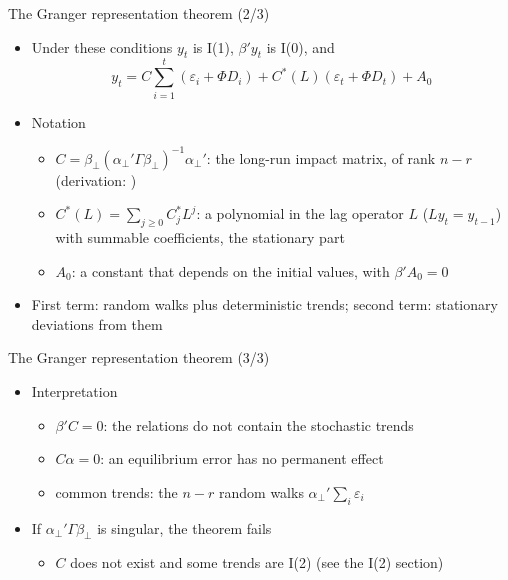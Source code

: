 \begin{frame}{The Granger representation theorem (2/3)}
\itemsize{\small}
\begin{itemize}
    \item Under these conditions $y_t$ is I(1), $\beta'y_t$ is I(0), and \[ y_t = C\sum_{i=1}^{t}(\varepsilon_i + \Phi D_i) + C^*(L)(\varepsilon_t + \Phi D_t) + A_0 \]
    \item Notation
    \begin{itemize}
        \item $C = \beta_\perp(\alpha_\perp'\Gamma\beta_\perp)^{-1}\alpha_\perp'$: the long-run impact matrix, of rank $n - r$ (derivation: )  %
        \item $C^*(L) = \sum_{j\ge 0}C_j^*L^j$: a polynomial in the lag operator $L$ ($Ly_t = y_{t-1}$) with summable coefficients, the stationary part
        \item $A_0$: a constant that depends on the initial values, with $\beta'A_0 = 0$
    \end{itemize}
    \item First term: random walks plus deterministic trends; second term: stationary deviations from them
\end{itemize}
\end{frame}

\begin{frame}{The Granger representation theorem (3/3)}
\itemsize{\small}
\begin{itemize}
    \item Interpretation
    \begin{itemize}
        \item $\beta'C = 0$: the relations do not contain the stochastic trends
        \item $C\alpha = 0$: an equilibrium error has no permanent effect
        \item common trends: the $n - r$ random walks $\alpha_\perp'\sum_i\varepsilon_i$
    \end{itemize}
    \item If $\alpha_\perp'\Gamma\beta_\perp$ is singular, the theorem fails
    \begin{itemize}
        \item $C$ does not exist and some trends are I(2) (see the I(2) section)
    \end{itemize}
\end{itemize}
\end{frame}

